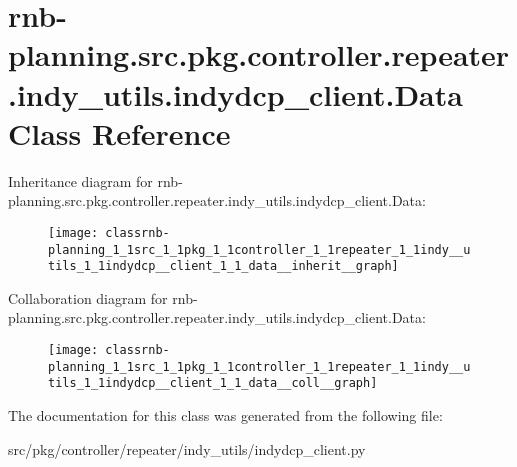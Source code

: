 \hypertarget{classrnb-planning_1_1src_1_1pkg_1_1controller_1_1repeater_1_1indy__utils_1_1indydcp__client_1_1_data}{}\section{rnb-\/planning.src.\+pkg.\+controller.\+repeater.\+indy\+\_\+utils.\+indydcp\+\_\+client.\+Data Class Reference}
\label{classrnb-planning_1_1src_1_1pkg_1_1controller_1_1repeater_1_1indy__utils_1_1indydcp__client_1_1_data}


Inheritance diagram for rnb-\/planning.src.\+pkg.\+controller.\+repeater.\+indy\+\_\+utils.\+indydcp\+\_\+client.\+Data\+:
\nopagebreak
\begin{figure}[H]
\begin{center}
\leavevmode
\texttt{[image: classrnb-planning\_1\_1src\_1\_1pkg\_1\_1controller\_1\_1repeater\_1\_1indy\_\_utils\_1\_1indydcp\_\_client\_1\_1\_data\_\_inherit\_\_graph]}
\end{center}
\end{figure}


Collaboration diagram for rnb-\/planning.src.\+pkg.\+controller.\+repeater.\+indy\+\_\+utils.\+indydcp\+\_\+client.\+Data\+:
\nopagebreak
\begin{figure}[H]
\begin{center}
\leavevmode
\texttt{[image: classrnb-planning\_1\_1src\_1\_1pkg\_1\_1controller\_1\_1repeater\_1\_1indy\_\_utils\_1\_1indydcp\_\_client\_1\_1\_data\_\_coll\_\_graph]}
\end{center}
\end{figure}


The documentation for this class was generated from the following file\+:\begin{DoxyCompactItemize}
\item 
src/pkg/controller/repeater/indy\+\_\+utils/indydcp\+\_\+client.\+py\end{DoxyCompactItemize}
